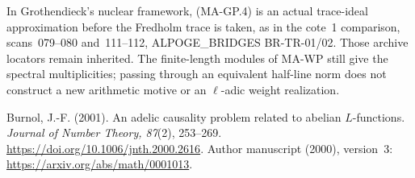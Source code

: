 In Grothendieck's nuclear framework, (MA-GP.4) is an actual
trace-ideal approximation before the Fredholm trace is taken,
as in the cote~1 comparison, scans~079--080 and~111--112,
ALPOGE\_BRIDGES BR-TR-01/02.  Those archive locators remain
inherited.  The finite-length modules of MA-WP still give
the spectral multiplicities; passing through an equivalent
half-line norm does not construct a new arithmetic motive
or an $\ell$-adic weight realization.

Burnol, J.-F. (2001). An adelic causality problem related
to abelian $L$-functions. \emph{Journal of Number Theory, 87}(2),
253--269. \url{https://doi.org/10.1006/jnth.2000.2616}.
Author manuscript (2000), version~3:
\url{https://arxiv.org/abs/math/0001013}.
